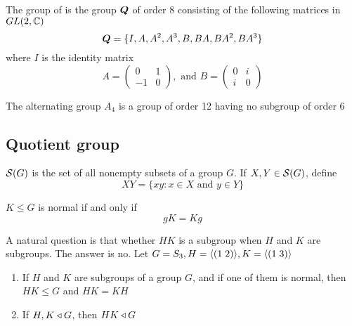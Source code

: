 \documentclass[11pt]{article}
\begin{document}
\begin{definition}[]
The group of  is the group \(\boldsymbol{Q}\) of order 8 consisting of the
following matrices in \(GL(2, \mathbb{C})\)
\begin{equation*}
\boldsymbol{Q}=\{I,A,A^2,A^3,B,BA,BA^2,BA^3\}
\end{equation*}
where \(I\) is the identity matrix
\begin{equation*}
A=
\begin{pmatrix}
0&1\\
-1&0
\end{pmatrix}, \text{ and }
B=\begin{pmatrix}
0&i\\
i&0
  \end{pmatrix}
\end{equation*}
\end{definition}


\begin{proposition}[]
The alternating group \(A_4\) is a group of order 12 having no subgroup of
order 6
\end{proposition}
\subsection{Quotient group}
\label{sec:org256de84}
\(\mathcal{S}(G)\) is the set of all nonempty subsets of a group \(G\). If
\(X,Y\in\mathcal{S}(G)\), define
\begin{equation*}
XY=\{xy:x\in X\text{ and } y\in Y\}
\end{equation*}

\begin{lemma}[]
\(K\le G\) is normal if and only if
\begin{equation*}
gK=Kg
\end{equation*}
\end{lemma}

A natural question is that whether \(HK\) is a subgroup when \(H\) and \(K\) are
subgroups. The answer is no. Let \(G=S_3,H=\langle(1\;2)\rangle,K=\langle(1\;3)\rangle\)


\begin{proposition}[]
\begin{enumerate}
\item If \(H\) and \(K\) are subgroups of a group \(G\), and if one of them is normal,
then \(HK\le G\) and \(HK=KH\)
\item If \(H,K\triangleleft G\), then \(HK\triangleleft G\)
\end{enumerate}
\end{proposition}
\end{document}
